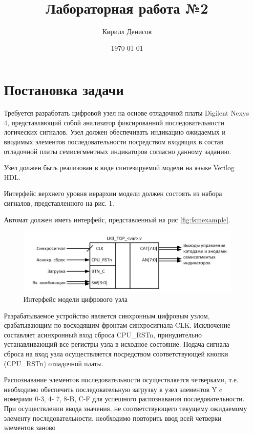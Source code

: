 \documentclass[a4paper,14pt]{extarticle}
\author{Кирилл Денисов}
\title{Лабораторная работа №2}
\date{\today}
\newcommand{\pathToCommonFolder}{/home/denilai/Documents/repos/latex/Common}
\begin{document}
	\thispagestyle{empty}
	
	\newpage
	\newpage
\section*{Постановка задачи}	

Требуется разработать цифровой узел на основе отладочной платы Digilent Nexys 4,
представляющий собой анализатор фиксированной последовательности логических
сигналов. Узел должен обеспечивать индикацию ожидаемых и вводимых элементов
последовательности посредством входящих в состав отладочной платы семисегментных
индикаторов согласно данному заданию.

Узел должен быть реализован в виде синтезируемой модели на языке Verilog HDL.

Интерфейс верхнего уровня иерархии модели должен состоять из набора сигналов,
представленного на рис. 1.

Автомат должен иметь интерфейс, представленный на рис \ref{fig:fsmexample}.

\begin{figure}[h!]
	\centering
	\includegraphics[width=0.7\linewidth]{images/interface-pract3}
	\caption{Интерфейс модели цифрового узла}
	\label{fig:interface-pract3}
\end{figure}


Разрабатываемое устройство является синхронным цифровым узлом,
срабатывающим по восходящим фронтам синхросигнала CLK. Исключение составляет
асинхронный вход сброса CPU\_RSTn, принудительно устанавливающий все регистры
узла в исходное состояние. Подача сигнала сброса на вход узла осуществляется
посредством соответствующей кнопки (CPU\_RSTn) отладочной платы.

Распознавание элементов последовательности осуществляется четверками, т.е.
необходимо обеспечить последовательную загрузку в узел элементов Y c номерами 0-3, 4-
7, 8-B, C-F для успешного распознавания последовательности. При осуществлении ввода
значения, не соответствующего текущему ожидаемому элементу последовательности,
необходимо повторить ввод всей четверки элементов заново
\end{document}
